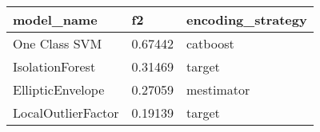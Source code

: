 \begin{tabular}{|l|l|l|}
\hline
\textbf{model\_name} & \textbf{f2} & \textbf{encoding\_strategy} \\ \hline
One Class SVM        & 0.67442     & catboost                    \\ \hline
IsolationForest      & 0.31469     & target                      \\ \hline
EllipticEnvelope     & 0.27059     & mestimator                  \\ \hline
LocalOutlierFactor   & 0.19139     & target                      \\ \hline
\end{tabular}
